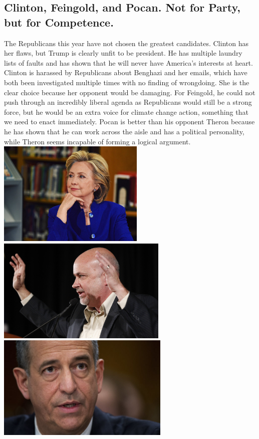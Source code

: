 \documentclass[twoside]{article}
\begin{document}
              \subsection{Clinton, Feingold, and Pocan. Not for Party, but for Competence.}
              The Republicans this year have not chosen the greatest candidates. Clinton has her flaws, but Trump is clearly unfit to be president.
              He has multiple laundry lists of faults and has shown that he will never have America’s interests at heart.
              Clinton is harassed by Republicans about Benghazi and her emails, which have both been investigated multiple times with no finding of wrongdoing.
              She is the clear choice because her opponent would be damaging.
              For Feingold, he could not push through an incredibly liberal agenda as Republicans would still be a strong force, but he would be an extra voice for climate change action,
              something that we need to enact immediately. Pocan is better than his opponent Theron because he has shown that he can work across the aisle and has a political personality,
              while Theron seems incapable of forming a logical argument.\\\vskip2cm
              {
              \centering
              \includegraphics[width=\textwidth,height=5cm,keepaspectratio]{images/profiles/clinton.jpg}\\
              \includegraphics[width=\textwidth,height=5cm,keepaspectratio]{images/profiles/pocan.jpg}\\
              \includegraphics[width=\textwidth,height=5cm,keepaspectratio]{images/profiles/feingold.jpeg}\\
              }
              \newpage
\end{document}
